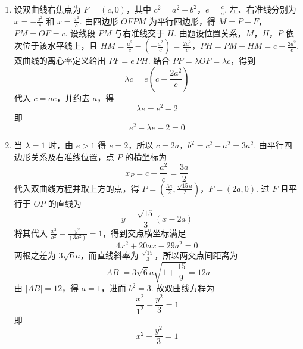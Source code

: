 \begin{solution}
\begin{enumerate}
\item 设双曲线右焦点为 \(F=(c,0)\)，其中
\(c^2=a^2+b^2\)，\(e=\frac ca\).
左、右准线分别为 \(x=-\frac{a^2}{c}\) 和 \(x=\frac{a^2}{c}\). 由四边形 \(OFPM\) 为平行四边形，得
\(M=P-F\)，\(PM=OF=c\).
设线段 \(PM\) 与右准线交于 \(H\). 由题设位置关系，\(M\)，\(H\)，\(P\) 依次位于该水平线上，且
\(HM=\frac{a^2}{c}-\left(-\frac{a^2}{c}\right)=\frac{2a^2}{c}\)，\(PH=PM-HM=c-\frac{2a^2}{c}\).
双曲线的离心率定义给出 \(PF=e\,PH\). 结合 \(PF=\lambda OF=\lambda c\)，得到
\[
\lambda c=e\left(c-\frac{2a^2}{c}\right)
\]
代入 \(c=ae\)，并约去 \(a\)，得
\[
\lambda e=e^2-2
\]
即
\[
e^2-\lambda e-2=0
\]

\item 当 \(\lambda=1\) 时，由 \(e>1\) 得 \(e=2\)，所以
\(c=2a\)，\(b^2=c^2-a^2=3a^2\).
由平行四边形关系及右准线位置，点 \(P\) 的横坐标为
\[
x_P=c-\frac{a^2}{c}=\frac{3a}{2}
\]
代入双曲线方程并取上方的点，得
\(P=\left(\frac{3a}{2},\frac{\sqrt{15}a}{2}\right)\)，\(F=(2a,0)\).
过 \(F\) 且平行于 \(OP\) 的直线为
\[
y=\frac{\sqrt{15}}{3}(x-2a)
\]
将其代入 \(\frac{x^2}{a^2}-\frac{y^2}{(3a^2)}=1\)，得到交点横坐标满足
\[
4x^2+20ax-29a^2=0
\]
两根之差为 \(3\sqrt6a\)，而直线斜率为 \(\frac{\sqrt{15}}{3}\)，所以两交点间距离为
\[
|AB|=3\sqrt6a\sqrt{1+\frac{15}{9}}=12a
\]
由 \(|AB|=12\)，得 \(a=1\)，进而 \(b^2=3\). 故双曲线方程为
\[
\frac{x^2}{1^2}-\frac{y^2}{3}=1
\]
即
\[
x^2-\frac{y^2}{3}=1
\]
\end{enumerate}
\end{solution}

